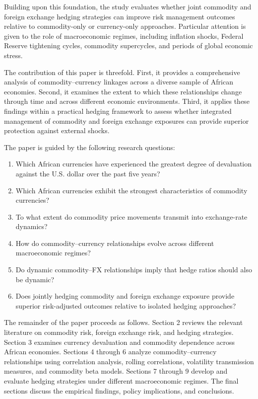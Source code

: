 \documentclass{article}
\begin{document}
Building upon this foundation, the study evaluates whether joint commodity and foreign exchange hedging strategies can improve risk management outcomes relative to commodity-only or currency-only approaches. Particular attention is given to the role of macroeconomic regimes, including inflation shocks, Federal Reserve tightening cycles, commodity supercycles, and periods of global economic stress.

The contribution of this paper is threefold. First, it provides a comprehensive analysis of commodity--currency linkages across a diverse sample of African economies. Second, it examines the extent to which these relationships change through time and across different economic environments. Third, it applies these findings within a practical hedging framework to assess whether integrated management of commodity and foreign exchange exposures can provide superior protection against external shocks.

The paper is guided by the following research questions:

\begin{enumerate}
    \item Which African currencies have experienced the greatest degree of devaluation against the U.S. dollar over the past five years?
    
    \item Which African currencies exhibit the strongest characteristics of commodity currencies?
    
    \item To what extent do commodity price movements transmit into exchange-rate dynamics?
    
    \item How do commodity--currency relationships evolve across different macroeconomic regimes?
    
    \item Do dynamic commodity--FX relationships imply that hedge ratios should also be dynamic?
    
    \item Does jointly hedging commodity and foreign exchange exposure provide superior risk-adjusted outcomes relative to isolated hedging approaches?
\end{enumerate}

The remainder of the paper proceeds as follows. Section 2 reviews the relevant literature on commodity risk, foreign exchange risk, and hedging strategies. Section 3 examines currency devaluation and commodity dependence across African economies. Sections 4 through 6 analyze commodity--currency relationships using correlation analysis, rolling correlations, volatility transmission measures, and commodity beta models. Sections 7 through 9 develop and evaluate hedging strategies under different macroeconomic regimes. The final sections discuss the empirical findings, policy implications, and conclusions.
\end{document}
